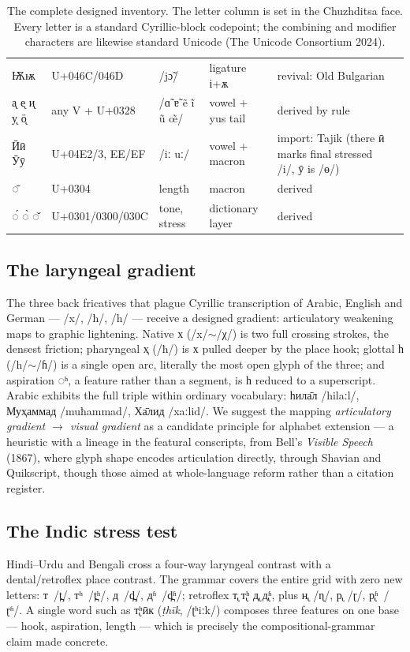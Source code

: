 \documentclass[12pt]{article}
\newcommand{\cz}[1]{{\chu #1}}
\newcommand{\ph}[1]{{\ipafont/#1/}}
\begin{document}
\begin{table}[ht]
\begin{tabular}{llllll}
\cz{Ѭѭ} & U+046C/046D & \ph{jɔ̃} & ligature і+ѫ & revival: Old Bulgarian \\
\cz{а̨ е̨ и̨ у̨ ӧ̨} & any V + U+0328 & \ph{ɑ̃ ɐ̃ ẽ ĩ ũ œ̃} & vowel + yus tail & derived by rule \\
\cz{Ӣӣ Ӯӯ} & U+04E2/3, EE/EF & \ph{iː uː} & vowel + macron & import: Tajik (there ӣ marks final stressed \ph{i}, ӯ is \ph{ɵ}) \\
\cz{◌̄} & U+0304 & length & macron & derived \\
\cz{◌́ ◌̀ ◌̌} & U+0301/0300/030C & tone, stress & dictionary layer & derived \\
\bottomrule
\end{tabular}
\caption{The complete designed inventory. The letter column is set in the Chuzhditsa face. Every letter is a standard Cyrillic-block codepoint; the combining and modifier characters are likewise standard Unicode (The Unicode Consortium 2024).}
\label{tab:inventory}
\end{table}

\subsection{The laryngeal gradient}
The three back fricatives that plague Cyrillic transcription of Arabic, English and German — \ph{x}, \ph{ħ}, \ph{h} — receive a designed gradient: articulatory weakening maps to graphic lightening. Native \cz{х} (\ph{x}$\sim$\ph{χ}) is two full crossing strokes, the densest friction; pharyngeal \cz{ҳ} (\ph{ħ}) is \cz{х} pulled deeper by the place hook; glottal \cz{һ} (\ph{h}$\sim$\ph{ɦ}) is a single open arc, literally the most open glyph of the three; and aspiration \cz{◌ʰ}, a feature rather than a segment, is \cz{һ} reduced to a superscript. Arabic exhibits the full triple within ordinary vocabulary: \cz{һила̄л} \ph{hilaːl}, \cz{Муҳаммад} \ph{muħammad}, \cz{Ха̄лид} \ph{xaːlid}. We suggest the mapping \emph{articulatory gradient $\rightarrow$ visual gradient} as a candidate principle for alphabet extension — a heuristic with a lineage in the featural conscripts, from Bell's \emph{Visible Speech} (1867), where glyph shape encodes articulation directly, through Shavian and Quikscript, though those aimed at whole-language reform rather than a citation register.

\subsection{The Indic stress test}
Hindi--Urdu and Bengali cross a four-way laryngeal contrast with a dental/retroflex place contrast. The grammar covers the entire grid with zero new letters: \cz{т}~\ph{t̪}, \cz{тʰ}~\ph{t̪ʰ}, \cz{д}~\ph{d̪}, \cz{дʱ}~\ph{d̪ʱ}; retroflex \cz{т̢ т̢ʰ д̢ д̢ʱ}, plus \cz{н̢}~\ph{ɳ}, \cz{р̢}~\ph{ɽ}, \cz{р̢ʱ}~\ph{ɽʱ}. A single word such as \cz{т̢ʰӣк} (\emph{ṭhīk}, \ph{ʈʰiːk}) composes three features on one base — hook, aspiration, length — which is precisely the compositional-grammar claim made concrete.
\end{document}

